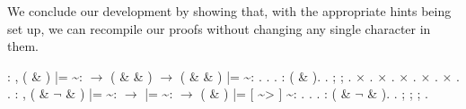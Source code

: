 \documentclass[12pt]{report}
\begin{document}
 We conclude our development by showing that, with the appropriate
    hints being set up, we can recompile our proofs without changing 
    any single character in them.
\begin{coqdoccode}
\coqdocemptyline
\coqdocnoindent
{}  : \coqdockw{\ensuremath{\forall}}     ,\coqdoceol
\coqdocindent{1.50em}
( \& ) |=  \~{}:  \ensuremath{\rightarrow} \coqdoceol
\coqdocindent{1.50em}
 ( \&  \& ) \ensuremath{\rightarrow}\coqdoceol
\coqdocindent{1.50em}
( \&  \& ) |=  \~{}: .\coqdoceol
\coqdocnoindent
{}.\coqdoceol
\coqdocindent{1.00em}
 .  : ( \& ).  .\coqdoceol
\coqdocindent{1.00em}
 ;    ; .\coqdoceol
\coqdocindent{1.00em}
\ensuremath{\times} . \ensuremath{\times} .\coqdoceol
\coqdocindent{1.00em}
\ensuremath{\times}   . \ensuremath{\times} .\coqdoceol
\coqdocindent{1.00em}
\ensuremath{\times} .\coqdoceol
\coqdocnoindent
{}.\coqdoceol
\coqdocemptyline
\coqdocnoindent
{}  : \coqdockw{\ensuremath{\forall}}       ,\coqdoceol
\coqdocindent{1.00em}
( \&  \ensuremath{\lnot}  \& ) |=  \~{}:  \ensuremath{\rightarrow}\coqdoceol
\coqdocindent{1.00em}
 |=  \~{}:  \ensuremath{\rightarrow}\coqdoceol
\coqdocindent{1.00em}
( \& ) |= [ \~{}> ] \~{}: .\coqdoceol
\coqdocnoindent
{}.\coqdoceol
\coqdocindent{1.00em}
  .  : ( \&  \ensuremath{\lnot}  \& ).  .\coqdoceol
\coqdocindent{1.00em}
 ;   ; ;  .\coqdoceol

\end{coqdoccode}
\end{document}
